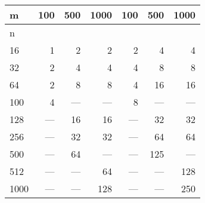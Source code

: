 \begin{tabular}{lrrrrrr}
\toprule
{m} &  100  &  500  &  1000   &  100  &  500  &  1000\\
\midrule
n    &       &       &       &     &       &       \\
16   &     1 &     2 &     2 &   2 &     4 &     4 \\
32   &     2 &     4 &     4 &   4 &     8 &     8 \\
64   &     2 &     8 &     8 &   4 &    16 &    16 \\
100  &     4 &   --- &   --- &   8 &   --- &   --- \\
128  &   --- &    16 &    16 & --- &    32 &    32 \\
256  &   --- &    32 &    32 & --- &    64 &    64 \\
500  &   --- &    64 &   --- & --- &   125 &   --- \\
512  &   --- &   --- &    64 & --- &   --- &   128 \\
1000 &   --- &   --- &   128 & --- &   --- &   250 \\
\bottomrule
\end{tabular}
